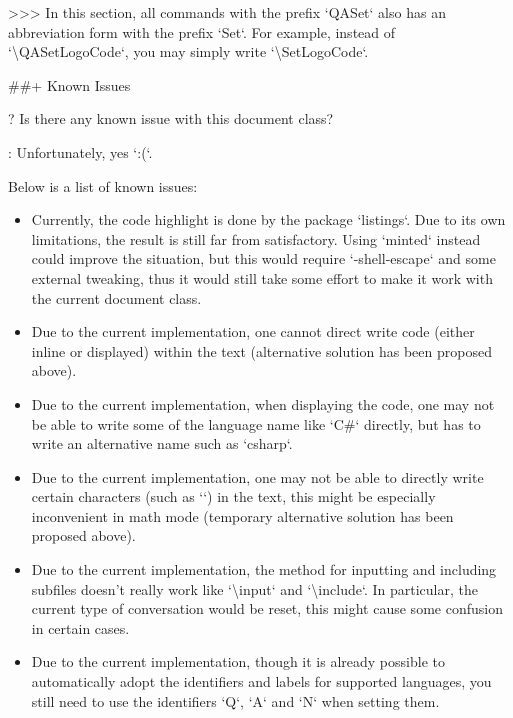 \documentclass[%
  use style = classical,
  scroll,
]{Q-and-A}
\begin{document}
  >>> In this section, all commands with the prefix `QASet` also has an abbreviation form with the prefix `Set`. For example, instead of `\textbackslash QASetLogoCode`, you may simply write `\textbackslash SetLogoCode`.


##+ {Known Issues}

?
  Is there any known issue with this document class?

:
  Unfortunately, yes `:(`.

  Below is a list of known issues:

  \begin{itemize}
    \item Currently, the code highlight is done by the package `listings`. Due to its own limitations, the result is still far from satisfactory. Using `minted` instead could improve the situation, but this would require `-shell-escape` and some external tweaking, thus it would still take some effort to make it work with the current document class.
    \item Due to the current implementation, one cannot direct write code (either inline or displayed) within the text (alternative solution has been proposed above).
    \item Due to the current implementation, when displaying the code, one may not be able to write some of the language name like `C\#` directly, but has to write an alternative name such as `csharp`.
    \item Due to the current implementation, one may not be able to directly write certain characters (such as `\textasterisk`) in the text, this might be especially inconvenient in math mode (temporary alternative solution has been proposed above).
    \item Due to the current implementation, the method for inputting and including subfiles doesn't really work like `\textbackslash input` and `\textbackslash include`. In particular, the current type of conversation would be reset, this might cause some confusion in certain cases.
    \item Due to the current implementation, though it is already possible to automatically adopt the identifiers and labels for supported languages, you still need to use the identifiers `Q`, `A` and `N` when setting them.

\end{itemize}
\end{document}
